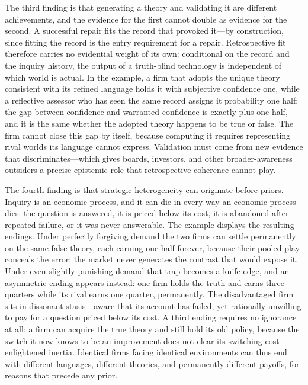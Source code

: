 \documentclass[11pt]{article}
\theoremstyle{definition}
\begin{document}
The third finding is that generating a theory and validating it are different achievements, and the evidence for the first cannot double as evidence for the second.
A successful repair fits the record that provoked it---by construction, since fitting the record is the entry requirement for a repair.
Retrospective fit therefore carries no evidential weight of its own: conditional on the record and the inquiry history, the output of a truth-blind technology is independent of which world is actual.
In the example, a firm that adopts the unique theory consistent with its refined language holds it with subjective confidence one, while a reflective assessor who has seen the same record assigns it probability one half: the gap between confidence and warranted confidence is exactly plus one half, and it is the same whether the adopted theory happens to be true or false.
The firm cannot close this gap by itself, because computing it requires representing rival worlds its language cannot express.
Validation must come from new evidence that discriminates---which gives boards, investors, and other broader-awareness outsiders a precise epistemic role that retrospective coherence cannot play.

The fourth finding is that strategic heterogeneity can originate before priors.
Inquiry is an economic process, and it can die in every way an economic process dies: the question is answered, it is priced below its cost, it is abandoned after repeated failure, or it was never answerable.
The example displays the resulting endings.
Under perfectly forgiving demand the two firms can settle permanently on the same false theory, each earning one half forever, because their pooled play conceals the error; the market never generates the contrast that would expose it.
Under even slightly punishing demand that trap becomes a knife edge, and an asymmetric ending appears instead: one firm holds the truth and earns three quarters while its rival earns one quarter, permanently.
The disadvantaged firm sits in dissonant stasis---aware that its account has failed, yet rationally unwilling to pay for a question priced below its cost.
A third ending requires no ignorance at all: a firm can acquire the true theory and still hold its old policy, because the switch it now knows to be an improvement does not clear its switching cost---enlightened inertia.
Identical firms facing identical environments can thus end with different languages, different theories, and permanently different payoffs, for reasons that precede any prior.
\end{document}
